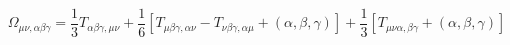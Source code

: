 \begin{equation}
\Omega_{\mu\nu,\alpha\beta\gamma} = \frac{1}{3}
T_{\alpha\beta\gamma,\mu\nu} + \frac{1}{6} [ T_{\mu\beta\gamma,\alpha
\nu} - T_{\nu\beta\gamma,\alpha\mu} + (\alpha,\beta,\gamma)] +
\frac{1}{3} [ T_{\mu\nu\alpha,\beta\gamma} + (\alpha,\beta,\gamma) ]
\end{equation}

